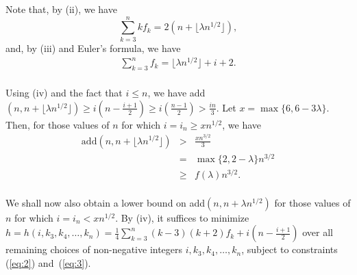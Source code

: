 \documentclass{article}
\newtheorem{Proof of Theorem}{Proof of Theorem}
\begin{document}
Note that, by (ii), we have
\begin{equation}
\sum_{k=3}^{n}kf_{k}=2(n+\lfloor \lambda n^{1/2} \rfloor), \label{eq:2}
\end{equation}
and, by (iii) and Euler's formula, we have
\begin{eqnarray}
\sum_{k=3}^{n}f_{k}=\lfloor \lambda n^{1/2} \rfloor+i+2. \label{eq:3} \\ \nonumber
\end{eqnarray} 

Using (iv) and the fact that $i \! \leq \! n$,
we have add$(n,n+\lfloor \lambda n^{1/2} \rfloor) \! \geq \!
i \left( n- \frac{i+1}{2} \right) \! \geq \! i \left( \frac{n-1}{2} \right) > \frac{in}{3}$.
Let $x= \max \{6, 6 - 3 \lambda \}$.
Then, for those values of $n$ for which
$i = i_{n} \geq xn^{1/2}$,
we have 
\begin{eqnarray}
\textrm{add}(n,n+\lfloor \lambda n^{1/2} \rfloor) 
& > & \frac{xn^{3/2}}{3} \label{eq:pre1} \\
& = & \max \{2, 2- \lambda \}n^{3/2} \nonumber \\
& \geq & f(\lambda)n^{3/2}. \nonumber \\ \nonumber 
\end{eqnarray}

We shall now also obtain a lower bound on add$(n,n + \lambda n^{1/2})$ for those values of $n$ for which 
$i = i_{n} < xn^{1/2}$. 
By (iv), it suffices to minimize 
$h = h(i,k_{3},k_{4}, \ldots, k_{n}) = \frac{1}{4} \sum_{k=3}^{n}(k-3)(k+2)f_{k} +i(n- \frac{i+1}{2})$ 
over all remaining choices of non-negative integers $i,k_{3},k_{4}, \ldots, k_{n}$,
subject to constraints (\ref{eq:2}) and~(\ref{eq:3}).
\end{document}
